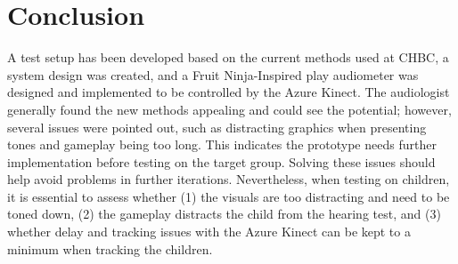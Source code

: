 \section{Conclusion} \label{Conclusion}
A test setup has been developed based on the current methods used at CHBC, a system design was created, and a Fruit Ninja-Inspired play audiometer was designed and implemented to be controlled by the Azure Kinect. The audiologist generally found the new methods appealing and could see the potential; however, several issues were pointed out, such as distracting graphics when presenting tones and gameplay being too long. This indicates the prototype needs further implementation before testing on the target group. Solving these issues should help avoid problems in further iterations. Nevertheless, when testing on children, it is essential to assess whether (1) the visuals are too distracting and need to be toned down, (2) the gameplay distracts the child from the hearing test, and (3) whether delay and tracking issues with the Azure Kinect can be kept to a minimum when tracking the children. 